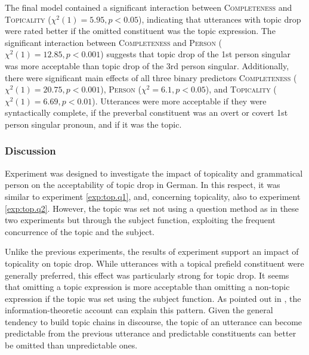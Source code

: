 \noindent
The final model contained a significant interaction between \textsc{Completeness} and \textsc{Topicality} ($\chi^2(1) = 5.95, p < 0.05$), indicating that utterances with topic drop were rated better if the omitted constituent was the topic expression.
The significant interaction between \textsc{Completeness} and \textsc{Person} ($\chi^2(1) = 12.85, p < 0.001$) suggests that topic drop of the 1st person singular was more acceptable than topic drop of the 3rd person singular.
Additionally, there were significant main effects of all three binary predictors \textsc{Completeness} ($\chi^2(1) = 20.75, p < 0.001$), \textsc{Person} ($\chi^2 = 6.1, p < 0.05$), and \textsc{Topicality} ($\chi^2(1) = 6.69, p < 0.01$).
Utterances were more acceptable if they were syntactically complete, if the preverbal constituent was an overt or covert 1st person singular pronoun, and if it was the topic.

\subsubsection{Discussion}\label{sec:exp.top.fv.diss}
Experiment  was designed to investigate the impact of topicality and grammatical person on the acceptability of topic drop in German.
In this respect, it was similar to experiment \ref*{exp:top.q1}, and, concerning topicality, also to experiment \ref*{exp:top.q2}.
However, the topic was set not using a question method as in these two experiments but through the subject function, exploiting the frequent concurrence of the topic and the subject.

Unlike the previous experiments, the results of experiment  support an impact of topicality on topic drop.
While utterances with a topical prefield constituent were generally preferred, this effect was particularly strong for topic drop.
It seems that omitting a topic expression is more acceptable than omitting a non-topic expression if the topic was set using the subject function.
As pointed out in , the information-theoretic account can explain this pattern.
Given the general tendency to build topic chains in discourse, the topic of an utterance can become predictable from the previous utterance and predictable  constituents can better be omitted than unpredictable ones.

